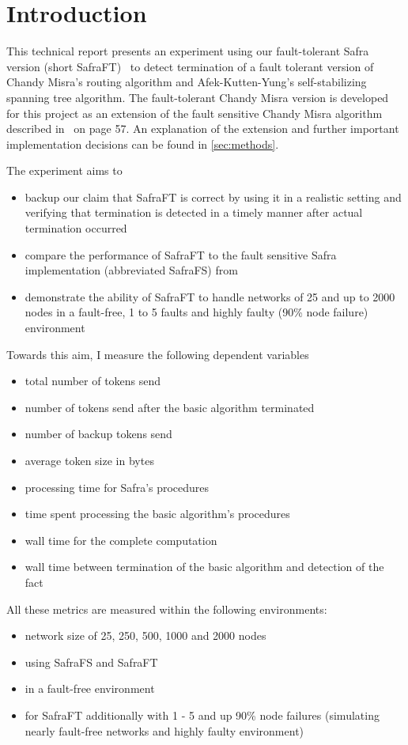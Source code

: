 \section{Introduction}
This technical report presents an experiment using our fault-tolerant Safra version (short SafraFT)~\cite{safraFT2018}
to detect termination of a fault tolerant version of Chandy Misra's routing algorithm and Afek-Kutten-Yung's self-stabilizing spanning tree algorithm.
The fault-tolerant Chandy Misra version is developed for this project as an extension of the fault sensitive Chandy Misra algorithm described in~\cite{Fokkink:2018} on page 57.
An explanation of the extension and further important implementation decisions can be found in \cref{sec:methods}.

The experiment aims to
\begin{itemize}
	\item backup our claim that SafraFT is correct by using it in a realistic setting and verifying that termination is detected in a timely manner after actual termination occurred
	\item compare the performance of SafraFT to the fault sensitive Safra implementation (abbreviated SafraFS) from \cite{demirbas2000optimal}
	\item demonstrate the ability of SafraFT to handle networks of 25 and up to 2000 nodes in a fault-free, 1 to 5 faults and highly faulty (90\% node failure) environment
\end{itemize}

Towards this aim, I measure the following dependent variables
\begin{itemize}
	\item total number of tokens send
	\item number of tokens send after the basic algorithm terminated
	\item number of backup tokens send
	\item average token size in bytes
	\item processing time for Safra's procedures
	\item time spent processing the basic algorithm's procedures
	\item wall time for the complete computation
	\item wall time  between termination of the basic algorithm and detection of the fact
\end{itemize}

All these metrics are measured within the following environments:
\begin{itemize}
	\item network size of 25, 250, 500, 1000 and 2000 nodes
	\item using SafraFS and SafraFT
	\item in a fault-free environment
	\item for SafraFT additionally with 1 - 5 and up 90\% node failures (simulating nearly fault-free networks and highly faulty environment)
\end{itemize}

